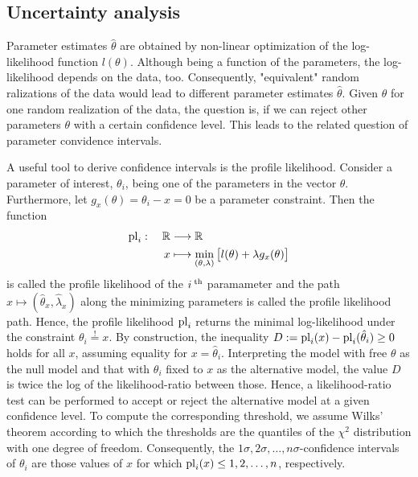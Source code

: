 \documentclass[article]{jss}
\begin{document}

\subsection{Uncertainty analysis}

Parameter estimates $\hat \theta$  are obtained by non-linear optimization of the log-likelihood function $l(\theta)$. Although being a function of the parameters,  the log-likelihood depends on the data, too. Consequently, "equivalent" random ralizations of the data would lead to different parameter estimates $\hat\theta$. Given $\hat\theta$ for one random realization of the data, the question is, if we can reject other parameters $\theta$ with a certain confidence level. This leads to the related question of parameter convidence intervals.

A useful tool to derive confidence intervals is the profile likelihood. Consider a parameter of interest, $\theta_i$, being one of the parameters in the vector $\theta$. Furthermore, let $g_x(\theta) = \theta_i - x = 0$ be a parameter constraint. Then the function 
\begin{align}
	\begin{aligned}
		{\rm pl}_i:\quad \mathbb R & \longrightarrow \mathbb R\\
		x & \longmapsto \min_{(\theta, \lambda)} \big[ l(\theta) + \lambda g_x(\theta) \big]
	\end{aligned}
	\label{eq:pl}
\end{align}
is called the profile likelihood of the $i^{\;\rm th}$ paramameter and the path $x \mapsto (\hat\theta_x, \hat\lambda_x)$ along the minimizing parameters is called the profile likelihood path. Hence, the profile likelihood ${\rm pl}_i$  returns the minimal log-likelihood under the constraint $\theta_i \stackrel{!}{=} x$. By construction, the inequality $D := {\rm pl}_i(x) - {\rm pl}_i(\hat \theta_i) \geq 0$ holds for all $x$, assuming equality for $x = \hat\theta_i$. Interpreting the model with free $\theta$ as the null model and that with $\theta_i$ fixed to $x$ as the alternative model, the value $D$ is twice the log of the likelihood-ratio between those. Hence, a likelihood-ratio test can be performed to accept or reject the alternative model at a given confidence level. To compute the corresponding threshold, we assume Wilks' theorem according to which the thresholds are the quantiles of the $\chi^2$ distribution with one degree of freedom. Consequently, the $1\sigma, 2\sigma, \dots, n\sigma$-confidence intervals of $\theta_i$ are those values of $x$ for which ${\rm pl}_i(x) \leq 1, 2, \dots, n$, respectively. 
\end{document}
